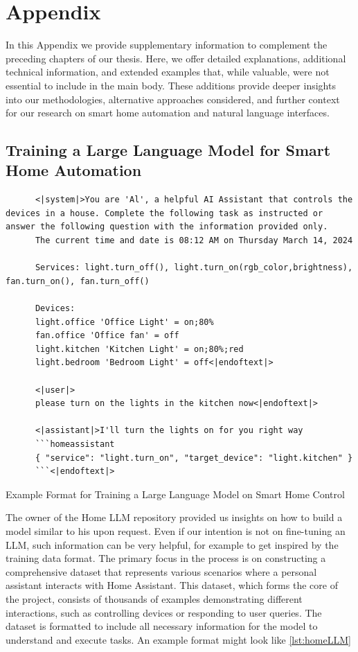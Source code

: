 \chapter{Appendix}
In this Appendix we provide supplementary information to complement the preceding chapters of our thesis. 
Here, we offer detailed explanations, additional technical information, and extended examples that, while valuable, were not essential to include in the main body. 
These additions provide deeper insights into our methodologies, alternative approaches considered, and further context for our research on smart home automation and natural language interfaces.

\section{Training a Large Language Model for Smart Home Automation}
\label{sec:relatedwork-appendix}
\begin{Listing}[bh]
    \begin{lstlisting}
      <|system|>You are 'Al', a helpful AI Assistant that controls the devices in a house. Complete the following task as instructed or answer the following question with the information provided only.
      The current time and date is 08:12 AM on Thursday March 14, 2024
      
      Services: light.turn_off(), light.turn_on(rgb_color,brightness), fan.turn_on(), fan.turn_off()
      
      Devices:
      light.office 'Office Light' = on;80%
      fan.office 'Office fan' = off
      light.kitchen 'Kitchen Light' = on;80%;red
      light.bedroom 'Bedroom Light' = off<|endoftext|>
      
      <|user|>
      please turn on the lights in the kitchen now<|endoftext|>
  
      <|assistant|>I'll turn the lights on for you right way
      ```homeassistant
      { "service": "light.turn_on", "target_device": "light.kitchen" }
      ```<|endoftext|>
    \end{lstlisting}
    \caption{Example Format for Training a Large Language Model on Smart Home Control}
    \label{lst:homeLLM}
  \end{Listing}
The owner of the Home LLM repository \cite{acon96_home_llm} provided us insights on how to build a model similar to his upon request.
Even if our intention is not on fine-tuning an LLM, such information can be very helpful, for example to get inspired by the training data format. 
The primary focus in the process is on constructing a comprehensive dataset that represents various scenarios where a personal assistant interacts with Home Assistant. This dataset, which forms the core of the project, consists of thousands of examples demonstrating different interactions, such as controlling devices or responding to user queries.
The dataset is formatted to include all necessary information for the model to understand and execute tasks. An example format might look like \cref{lst:homeLLM}

